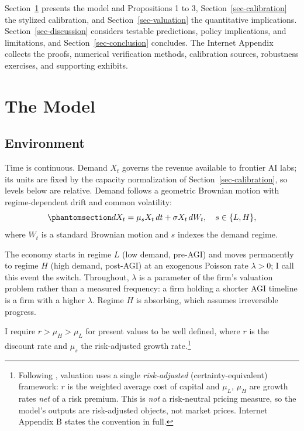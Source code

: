 \documentclass[
  11pt,
  letterpaper,
]{scrartcl}
\begin{document}
Section~\ref{sec-model} presents the model and Propositions 1 to 3,
Section~\ref{sec-calibration} the stylized calibration, and
Section~\ref{sec-valuation} the quantitative implications.
Section~\ref{sec-discussion} considers testable predictions, policy
implications, and limitations, and Section~\ref{sec-conclusion}
concludes. The Internet Appendix collects the proofs, numerical
verification methods, calibration sources, robustness exercises, and
supporting exhibits.

\section{The Model}\label{sec-model}

\subsection{Environment}\label{environment}

Time is continuous. Demand \(X_t\) governs the revenue available to
frontier AI labs; its units are fixed by the capacity normalization of
Section~\ref{sec-calibration}, so levels below are relative. Demand
follows a geometric Brownian motion with regime-dependent drift and
common volatility:
\begin{equation}\protect\phantomsection\label{eq-gbm}{
dX_t = \mu_s X_t \, dt + \sigma X_t \, dW_t, \quad s \in \{L, H\},
}\end{equation} where \(W_t\) is a standard Brownian motion and \(s\)
indexes the demand regime.

The economy starts in regime \(L\) (low demand, pre-AGI) and moves
permanently to regime \(H\) (high demand, post-AGI) at an exogenous
Poisson rate \(\lambda > 0\); I call this event the switch. Throughout,
\(\lambda\) is a parameter of the firm's valuation problem rather than a
measured frequency: a firm holding a shorter AGI timeline is a firm with
a higher \(\lambda\). Regime \(H\) is absorbing, which assumes
irreversible progress.

I require \(r > \mu_H > \mu_L\) for present values to be well defined,
where \(r\) is the discount rate and \(\mu_s\) the risk-adjusted growth
rate.\footnote{\label{fn:wacc}Following \citet[Chapter
  4]{dixit1994investment}, valuation uses a single \emph{risk-adjusted}
  (certainty-equivalent) framework: \(r\) is the weighted average cost
  of capital and \(\mu_L\), \(\mu_H\) are growth rates \emph{net} of a
  risk premium. This is \emph{not} a risk-neutral pricing measure, so
  the model's outputs are risk-adjusted objects, not market prices.
  Internet Appendix B states the convention in full.}
\end{document}
